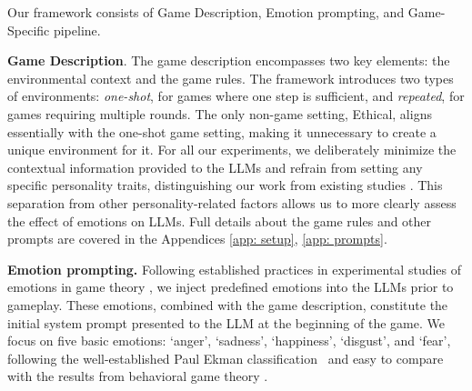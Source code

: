 \documentclass{article}
\begin{document}
Our framework consists of Game Description, Emotion prompting, and Game-Specific pipeline.

\textbf{Game Description}. The game description encompasses two key elements: the environmental context and the game rules. The framework introduces two types of environments: \textit{one-shot}, for games where one step is sufficient, and \textit{repeated}, for games requiring multiple rounds. The only non-game setting, Ethical, aligns essentially with the one-shot game setting, making it unnecessary to create a unique environment for it.
For all our experiments, we deliberately minimize the contextual information provided to the LLMs and refrain from setting any specific personality traits, distinguishing our work from existing studies \cite{brookins,xie2024can}. This separation from other personality-related factors allows us to more clearly assess the effect of emotions on LLMs. Full details about the game rules and other prompts are covered in the Appendices \ref{app: setup}, \ref{app: prompts}.



\textbf{Emotion prompting.} Following established practices in experimental studies of emotions in game theory \cite{KAUSEL201496,TAN2010571}, we inject predefined emotions into the LLMs prior to gameplay. These emotions, combined with the game description, constitute the initial system prompt presented to the LLM at the beginning of the game. We focus on five basic emotions: `anger', `sadness', `happiness', `disgust', and `fear', following the well-established Paul Ekman classification~\cite{ekman1999basic} and %
easy to compare with the results from behavioral game theory %
\cite{LARNEY201961, pere10.3389/fpsyg.2018.01542}. 
\end{document}
